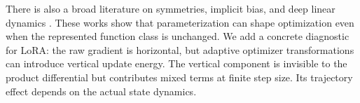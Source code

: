 There is also a broad literature on symmetries, implicit bias, and deep linear dynamics \cite{badrinarayanan2015symmetries,saxe2014exact,arora2020deep,arora2020greedy,soltanolkotabi2025implicit,hardt2016train}. These works show that parameterization can shape optimization even when the represented function class is unchanged. We add a concrete diagnostic for LoRA: the raw gradient is horizontal, but adaptive optimizer transformations can introduce vertical update energy. The vertical component is invisible to the product differential but contributes mixed terms at finite step size. Its trajectory effect depends on the actual state dynamics.
